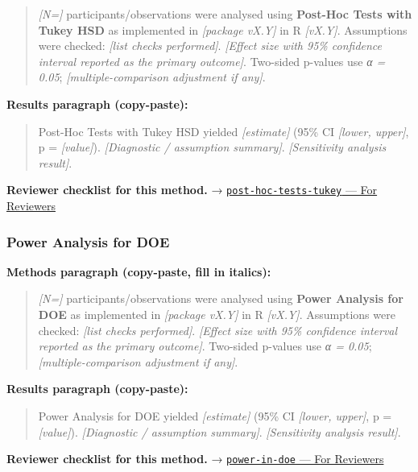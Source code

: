 \documentclass[
]{article}
\begin{document}
\begin{quote}
\emph{{[}N={]}} participants/observations were analysed using
\textbf{Post-Hoc Tests with Tukey HSD} as implemented in
\emph{{[}package vX.Y{]}} in R \emph{{[}vX.Y{]}}. Assumptions were
checked: \emph{{[}list checks performed{]}}. \emph{{[}Effect size with
95\% confidence interval reported as the primary outcome{]}}. Two-sided
p-values use \emph{α = 0.05}; \emph{{[}multiple-comparison adjustment if
any{]}}.
\end{quote}

\textbf{Results paragraph (copy-paste):}

\begin{quote}
Post-Hoc Tests with Tukey HSD yielded \emph{{[}estimate{]}} (95\% CI
\emph{{[}lower, upper{]}}, p = \emph{{[}value{]}}). \emph{{[}Diagnostic
/ assumption summary{]}}. \emph{{[}Sensitivity analysis result{]}}.
\end{quote}

\textbf{Reviewer checklist for this method.} →
\href{../chapters/04-inferential/post-hoc-tests-tukey.Rmd\#for-reviewers}{\texttt{post-hoc-tests-tukey}
--- For Reviewers}

\subsubsection{Power Analysis for DOE}\label{power-analysis-for-doe}

\textbf{Methods paragraph (copy-paste, fill in italics):}

\begin{quote}
\emph{{[}N={]}} participants/observations were analysed using
\textbf{Power Analysis for DOE} as implemented in \emph{{[}package
vX.Y{]}} in R \emph{{[}vX.Y{]}}. Assumptions were checked: \emph{{[}list
checks performed{]}}. \emph{{[}Effect size with 95\% confidence interval
reported as the primary outcome{]}}. Two-sided p-values use \emph{α =
0.05}; \emph{{[}multiple-comparison adjustment if any{]}}.
\end{quote}

\textbf{Results paragraph (copy-paste):}

\begin{quote}
Power Analysis for DOE yielded \emph{{[}estimate{]}} (95\% CI
\emph{{[}lower, upper{]}}, p = \emph{{[}value{]}}). \emph{{[}Diagnostic
/ assumption summary{]}}. \emph{{[}Sensitivity analysis result{]}}.
\end{quote}

\textbf{Reviewer checklist for this method.} →
\href{../chapters/16-design/power-in-doe.Rmd\#for-reviewers}{\texttt{power-in-doe}
--- For Reviewers}
\end{document}

